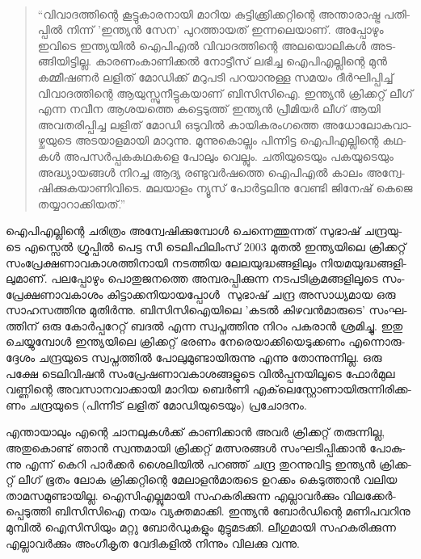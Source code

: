 \vskip 2pt

‌\begin{quotation}
­``വി­വാ­ദ­ത്തി­ന്റെ കൂ­ട്ടു­കാ­ര­നാ­യി മാ­റിയ കു­ട്ടി­ക്ക്രി­ക്ക­റ്റി­ന്റെ അന്താ­രാ­ഷ്ട്ര പതി­പ്പില്‍ നി­ന്ന് 'ഇ­ന്ത്യന്‍ സേ­ന' പു­റ­ത്താ­യ­ത് 
ഇന്ന­ലെ­യാ­ണ്. അപ്പോ­ഴും ഇവി­ടെ ഇന്ത്യ­യില്‍ ഐ­പി­എല്‍ വി­വാ­ദ­ത്തി­ന്റെ അല­യൊ­ലി­കള്‍ അട­ങ്ങി­യി­ട്ടി­ല്ല. 
കാ­ര­ണം­കാ­ണി­ക്കല്‍ നോ­ട്ടീ­സ് ലഭി­ച്ച ഐപി­എ­ല്ലി­ന്റെ മുന്‍ കമ്മീ­ഷ­ണര്‍ ലളി­ത് മോ­ഡി­ക്ക് മറു­പ­ടി പറ­യാ­നു­ള്ള 
സമ­യം ദീര്‍­ഘി­പ്പി­ച്ച് വി­വാ­ദ­ത്തി­ന്റെ ആയു­സ്സു­നീ­ട്ടു­ക­യാ­ണ് ബി­സി­സി­ഐ. ഇന്ത്യന്‍ ­ക്രി­ക്ക­റ്റ് ലീ­ഗ് എന്ന നവീന 
ആശ­യ­ത്തെ കട്ടെ­ടു­ത്ത് ഇന്ത്യന്‍ പ്രീ­മി­യര്‍ ലീ­ഗ് ആയി അവ­ത­രി­പ്പി­ച്ച ­ല­ളി­ത് മോ­ഡി­ ഒടു­വില്‍ കാ­യി­ക­രം­ഗ­ത്തെ 
അധോ­ലോ­ക­വാ­ഴ്ച­യു­ടെ അട­യാ­ള­മാ­യി മാ­റു­ന്നു. മൂ­ന്നു­കൊ­ല്ലം പി­ന്നി­ട്ട ഐപി­എ­ല്ലി­ന്റെ കഥ­കള്‍ അപ­സര്‍­പ്പ­ക­ക­ഥ­ക­ളെ 
പോ­ലും വെ­ല്ലും. ചതി­യു­ടെ­യും പക­യു­ടെ­യും അദ്ധ്യാ­യ­ങ്ങള്‍ നി­റ­ച്ച ആദ്യ രണ്ടു­വര്‍­ഷ­ത്തെ ഐപി­എല്‍ കാ­ലം 
അന്വേ­ഷി­ക്കു­ക­യാ­ണി­വി­ടെ­.  മല­യാ­ളം ന്യൂ­സ് പോര്‍­ട്ട­ലി­നു വേ­ണ്ടി ജി­നേ­ഷ് കെ­ജെ തയ്യാ­റാ­ക്കി­യ­ത്.''
\end{quotation}

{\vskip 12pt}

ഐ­പി­എ­ല്ലി­ന്റെ ചരി­ത്രം അന്വേ­ഷി­ക്കു­മ്പോള്‍ ചെ­ന്നെ­ത്തു­ന്ന­ത് സു­ഭാ­ഷ് ചന്ദ്ര­യു­ടെ എസ്സെല്‍ ഗ്രൂ­പ്പില്‍ പെ­ട്ട സീ ടെ­ലി­ഫി­ലിം­സ് 
2003 മു­തല്‍ ഇന്ത്യ­യി­ലെ ക്രി­ക്ക­റ്റ് സം­പ്രേ­ക്ഷ­ണാ­വ­കാ­ശ­ത്തി­നാ­യി നട­ത്തിയ ലേ­ല­യു­ദ്ധ­ങ്ങ­ളി­ലും നി­യ­മ­യു­ദ്ധ­ങ്ങ­ളി­ലു­മാ­ണ്. 
പല­പ്പോ­ഴും പൊ­തു­ജ­ന­ത്തെ അമ്പ­ര­പ്പി­ക്കു­ന്ന നട­പ­ടി­ക്ര­മ­ങ്ങ­ളി­ലൂ­ടെ സം­പ്രേ­ക്ഷ­ണാ­വ­കാ­ശം കി­ട്ടാ­ക്ക­നി­യാ­യ­പ്പോള്‍ ­
സു­ഭാ­ഷ് ചന്ദ്ര അസാ­ധ്യ­മായ ഒരു സാ­ഹ­സ­ത്തി­നു മു­തിര്‍­ന്നു. ബി­സി­സി­ഐ­യി­ലെ 'ക­ടല്‍ കി­ഴ­വന്‍­മാ­രു­ടെ' സം­ഘ­ത്തി­ന് 
ഒരു കോര്‍­പ്പ­റേ­റ്റ് ബദല്‍ എന്ന സ്വ­പ്ന­ത്തി­നു നി­റം പക­രാന്‍ ശ്ര­മി­ച്ചു. ഇതു ചെ­യ്യു­മ്പോള്‍ ഇന്ത്യ­യി­ലെ ക്രി­ക്ക­റ്റ് ഭര­ണം 
നേ­രെ­യാ­ക്കി­യെ­ടു­ക്ക­ണം എന്നൊ­രു­ദ്ദേ­ശം ചന്ദ്ര­യു­ടെ സ്വ­പ്ന­ത്തില്‍ പോ­ലു­മു­ണ്ടാ­യി­രു­ന്നു എന്നു തോ­ന്നു­ന്നി­ല്ല. ഒരു പക്ഷേ 
ടെ­ലി­വി­ഷന്‍ സം­പ്രേ­ഷ­ണാ­വ­കാ­ശ­ങ്ങ­ളു­ടെ വില്‍­പ്പ­ന­യി­ലൂ­ടെ ഫോര്‍­മുല വണ്ണി­ന്റെ അവ­സാ­ന­വാ­ക്കാ­യി മാ­റിയ ബെര്‍­ണി 
എക്‌­ലെ­സ്റ്റോ­ണാ­യി­രു­ന്നി­രി­ക്ക­ണം ചന്ദ്ര­യു­ടെ (പി­ന്നീ­ട് ലളി­ത് മോ­ഡി­യു­ടെ­യും) പ്ര­ചോ­ദ­നം­.

എ­ന്താ­യാ­ലും എന്റെ ചാ­ന­ലു­കള്‍­ക്ക് കാ­ണി­ക്കാന്‍ അവര്‍ ക്രി­ക്ക­റ്റ് തരു­ന്നി­ല്ല, അതു­കൊ­ണ്ട് ഞാന്‍ സ്വ­ന്ത­മാ­യി 
ക്രി­ക്ക­റ്റ് മത്സ­ര­ങ്ങള്‍ സം­ഘ­ടി­പ്പി­ക്കാന്‍ പോ­കു­ന്നു എന്ന് ­കെ­റി പാര്‍­ക്കര്‍ ശൈ­ലി­യില്‍ പറ­ഞ്ഞ് ചന്ദ്ര തു­റ­ന്നു­വി­ട്ട ഇന്ത്യന്‍ 
ക്രി­ക്ക­റ്റ് ലീ­ഗ് ഭൂ­തം ലോക ക്രി­ക്ക­റ്റി­ന്റെ മേ­ലാ­ളന്‍­മാ­രു­ടെ ഉറ­ക്കം കെ­ടു­ത്താന്‍ വലിയ താ­മ­സ­മു­ണ്ടാ­യി­ല്ല. ഐസി­എ­ല്ലു­മാ­യി 
സഹ­ക­രി­ക്കു­ന്ന എല്ലാ­വര്‍­ക്കും വി­ല­ക്കേര്‍­പ്പെ­ടു­ത്തി ­ബി­സി­സി­ഐ­ നയം വ്യ­ക്ത­മാ­ക്കി. ഇന്ത്യന്‍ ബോര്‍­ഡി­ന്റെ മണി­പ­വ­റി­നു 
മു­മ്പില്‍ ഐസി­സി­യും മറ്റു ബോര്‍­ഡു­ക­ളും മു­ട്ടു­മ­ട­ക്കി. ലീ­ഗു­മാ­യി സഹ­ക­രി­ക്കു­ന്ന എല്ലാ­വര്‍­ക്കും അം­ഗീ­കൃത വേ­ദി­ക­ളില്‍ നി­ന്നും 
വി­ല­ക്കു വന്നു.

